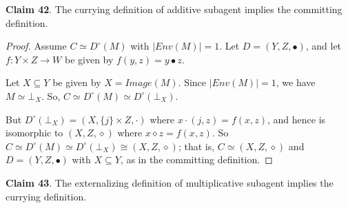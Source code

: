 \documentclass{article}
\begin{document}
\bigskip
\noindent \textbf{Claim 42}. The currying definition of additive subagent implies the committing definition.

\begin{proof}
Assume $C \simeq D^{\circ}(M)$ with $|Env(M)| = 1$.
Let $D = (Y, Z, \bullet)$, and let $f: Y \times Z \to W$ be given by $f(y, z) = y \bullet z$.

Let $X \subseteq Y$ be given by $X = Image(M)$.
Since $|Env(M)| = 1$, we have $M \simeq \bot_X$.
So, $C \simeq D^{\circ}(M) \simeq D^{\circ}(\bot_X)$.

But $D^{\circ}(\bot_X) = (X, \{j\} \times Z, \cdot)$ where $x \cdot (j, z) = f(x, z)$, and hence is isomorphic to $(X, Z, \diamond)$ where $x \diamond z = f(x, z)$.
So $C \simeq D^{\circ}(M) \simeq D^{\circ}(\bot_X) \cong (X, Z, \diamond)$;
that is, $C \simeq (X, Z, \diamond)$ and $D = (Y, Z, \bullet)$ with $X \subseteq Y$, as in the committing definition.
\end{proof}

\bigskip
\noindent \textbf{Claim 43}.
The externalizing definition of multiplicative subagent implies the currying definition.
\end{document}
